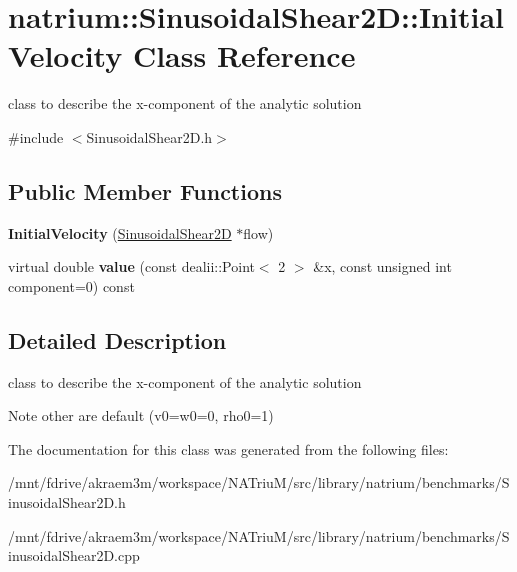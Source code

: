 \hypertarget{classnatrium_1_1SinusoidalShear2D_1_1InitialVelocity}{
\section{natrium::SinusoidalShear2D::InitialVelocity Class Reference}
\label{classnatrium_1_1SinusoidalShear2D_1_1InitialVelocity}
}


class to describe the x-\/component of the analytic solution  


{\ttfamily \#include $<$SinusoidalShear2D.h$>$}\subsection*{Public Member Functions}
\begin{DoxyCompactItemize}
\item 
\hypertarget{classnatrium_1_1SinusoidalShear2D_1_1InitialVelocity_af5c45670b73cfa376f5bb87df8f77749}{
{\bfseries InitialVelocity} (\hyperlink{classnatrium_1_1SinusoidalShear2D}{SinusoidalShear2D} $\ast$flow)}
\label{classnatrium_1_1SinusoidalShear2D_1_1InitialVelocity_af5c45670b73cfa376f5bb87df8f77749}

\item 
\hypertarget{classnatrium_1_1SinusoidalShear2D_1_1InitialVelocity_a802f5545be6cbd95555b9fe0ae900be2}{
virtual double {\bfseries value} (const dealii::Point$<$ 2 $>$ \&x, const unsigned int component=0) const }
\label{classnatrium_1_1SinusoidalShear2D_1_1InitialVelocity_a802f5545be6cbd95555b9fe0ae900be2}

\end{DoxyCompactItemize}


\subsection{Detailed Description}
class to describe the x-\/component of the analytic solution \begin{DoxyNote}{Note}
other are default (v0=w0=0, rho0=1) 
\end{DoxyNote}


The documentation for this class was generated from the following files:\begin{DoxyCompactItemize}
\item 
/mnt/fdrive/akraem3m/workspace/NATriuM/src/library/natrium/benchmarks/SinusoidalShear2D.h\item 
/mnt/fdrive/akraem3m/workspace/NATriuM/src/library/natrium/benchmarks/SinusoidalShear2D.cpp\end{DoxyCompactItemize}
